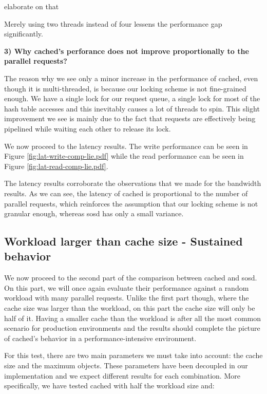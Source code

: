 \fixme elaborate on that

Merely using two threads instead of four lessens the performance gap 
significantly.

\textbf{3) Why cached's perforance does not improve proportionally to the 
	parallel requests?}

The reason why we see only a minor increase in the performance of cached, even 
though it is multi-threaded, is because our locking scheme is not fine-grained 
enough. We have a single lock for our request queue, a single lock for most of 
the hash table accesses and this inevitably causes a lot of threads to spin.  
This slight improvement we see is mainly due to the fact that requests are 
effectively being pipelined while waiting each other to release its lock.  

We now proceed to the latency results. The write performance can be seen in 
Figure \ref{fig:lat-write-comp-lie.pdf} while the read performance can be seen 
in Figure \ref{fig:lat-read-comp-lie.pdf}.


The latency results corroborate the observations that we made for the bandwidth 
results. As we can see, the latency of cached is proportional to the number of 
parallel requests, which reinforces the assumption that our locking scheme is 
not granular enough, whereas sosd has only a small variance.

\subsection{Workload larger than cache size - Sustained behavior}
\label{sec:sustained-plot}

We now proceed to the second part of the comparison between cached and sosd.  
On this part, we will once again evaluate their performance against a random 
workload with many parallel requests. Unlike the first part though, where the 
cache size was larger than the workload, on this part the cache size will
only be half of it. Having a smaller cache than the workload is after all the 
most common scenario for production environments and the results should 
complete the picture of cached's behavior in a performance-intensive 
environment.

For this test, there are two main parameters we must take into account: the 
cache size and the maximum objects. These parameters have been decoupled in our 
implementation and we expect different results for each combination. More 
specifically, we have tested cached with half the workload size and:

